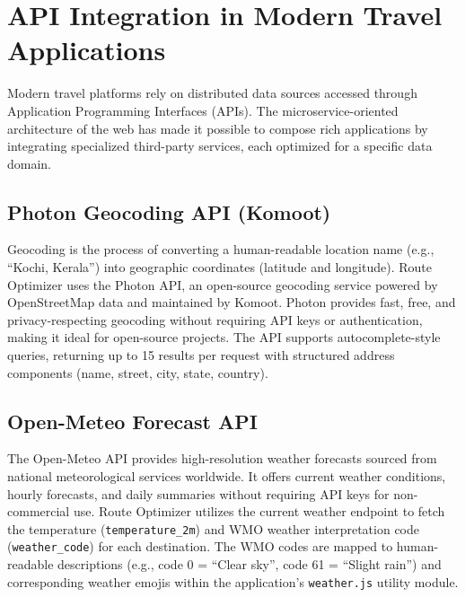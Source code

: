 \section{API Integration in Modern Travel Applications}
Modern travel platforms rely on distributed data sources accessed through Application Programming Interfaces (APIs). The microservice-oriented architecture of the web has made it possible to compose rich applications by integrating specialized third-party services, each optimized for a specific data domain.

\subsection{Photon Geocoding API (Komoot)}
Geocoding is the process of converting a human-readable location name (e.g., ``Kochi, Kerala'') into geographic coordinates (latitude and longitude). Route Optimizer uses the Photon API, an open-source geocoding service powered by OpenStreetMap data and maintained by Komoot. Photon provides fast, free, and privacy-respecting geocoding without requiring API keys or authentication, making it ideal for open-source projects. The API supports autocomplete-style queries, returning up to 15 results per request with structured address components (name, street, city, state, country).

\subsection{Open-Meteo Forecast API}
The Open-Meteo API provides high-resolution weather forecasts sourced from national meteorological services worldwide. It offers current weather conditions, hourly forecasts, and daily summaries without requiring API keys for non-commercial use. Route Optimizer utilizes the current weather endpoint to fetch the temperature (\texttt{temperature\_2m}) and WMO weather interpretation code (\texttt{weather\_code}) for each destination. The WMO codes are mapped to human-readable descriptions (e.g., code 0 = ``Clear sky'', code 61 = ``Slight rain'') and corresponding weather emojis within the application's \texttt{weather.js} utility module.

